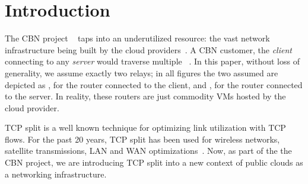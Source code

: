 \section{Introduction}
 The CBN project ~\cite{Elastic} taps into an underutilized resource: the vast network infrastructure being built by the cloud providers~\cite{aws2018spending, gcp2018spending, microsoft2018spending}. A CBN customer, the \textit{client} connecting to any \textit{server} would traverse multiple \relays ~\cite{CDD}. In this paper, without loss of generality, we assume exactly two relays; in all figures the two assumed \relays are depicted as \rc, for the router connected to the client, and \rs, for the router connected to the server. In reality, these routers are just commodity VMs hosted by the cloud provider.

 TCP split is a well known technique for optimizing link utilization with TCP flows. For the past 20 years, TCP split has been used for wireless networks, satellite transmissions, LAN and WAN optimizations~\cite{chakravorty2003aggregation, le2015experiences,luglio2004,siracusano2016miniproxy,kernelsplit, Akamai_Radio}. 
Now, as part of the the CBN project, we are introducing TCP split into a new context of public clouds as a networking infrastructure. %